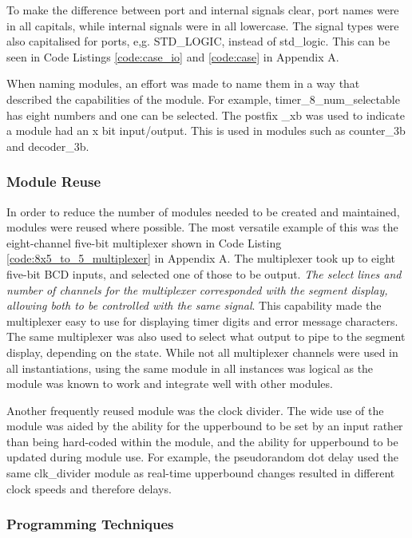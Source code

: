 \documentclass[11pt]{article}
\begin{document}
To make the difference between port and internal signals clear, port names were in all capitals, while internal signals were in all lowercase. The signal types were also capitalised for ports, e,g. STD\_LOGIC, instead of std\_logic. This can be seen in Code Listings \ref{code:case_io} and \ref{code:case} in Appendix A.

When naming modules, an effort was made to name them in a way that described the capabilities of the module. For example,  timer\_8\_num\_selectable has eight numbers and one can be selected. The postfix \_xb was used to indicate a module had an x bit input/output. This is used in modules such as counter\_3b and decoder\_3b.

\subsubsection{Module Reuse}

In order to reduce the number of modules needed to be created and maintained, modules were reused where possible. The most versatile example of this was the eight-channel five-bit multiplexer shown in Code Listing \ref{code:8x5_to_5_multiplexer} in Appendix A. The multiplexer took up to eight five-bit BCD inputs, and selected one of those to be output. \textit{The select lines and number of channels for the multiplexer corresponded with the segment display, allowing both to be controlled with the same signal}. This capability made the multiplexer easy to use for displaying timer digits and error message characters. The same multiplexer was also used to select what output to pipe to the segment display, depending on the state. While not all multiplexer channels were used in all instantiations, using the same module in all instances was logical as the module was known to work and integrate well with other modules.

Another frequently reused module was the clock divider. The wide use of the module was aided by the ability for the upperbound to be set by an input rather than being hard-coded within the module, and the ability for upperbound to be updated during module use.  For example, the pseudorandom dot delay used the same clk\_divider module as real-time upperbound changes resulted in different clock speeds and therefore delays.

\subsubsection{Programming Techniques}
\end{document}
